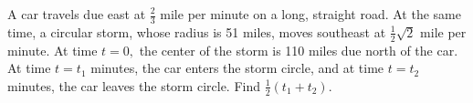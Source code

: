 A car travels due east at $\frac 23$ mile per minute on a long, straight road.  At the same time, a circular storm, whose radius is 51 miles, moves southeast at $\frac 12\sqrt{2}$ mile per minute.  At time $t=0,$ the center of the storm is 110 miles due north of the car.  At time $t=t_1$ minutes, the car enters the storm circle, and at time $t=t_2$ minutes, the car leaves the storm circle.  Find $\frac 12(t_1+t_2).$